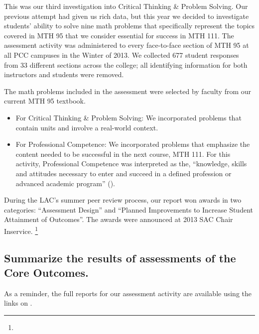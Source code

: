 \begin{description}
This was our third investigation into Critical Thinking \& Problem Solving.  Our previous attempt had given
us rich data, but this year we decided to investigate students' ability to solve
nine math problems that specifically represent the topics covered in MTH 95 that
we consider essential for success in MTH 111.  The assessment activity was
administered to every face-to-face section of MTH 95 at all PCC campuses in the
Winter of 2013.  We collected 677 student responses from 33 different sections
across the college; all identifying information for both instructors and
students were removed.

The math problems included in the assessment were selected by faculty from our
current MTH 95 textbook.
\begin{itemize}
\item For Critical Thinking \& Problem Solving: We incorporated problems that contain units and involve a
  real-world context.
\item For Professional Competence:  We incorporated problems that emphasize the content needed to be
  successful in the next course, MTH 111.  For this activity, Professional
  Competence was interpreted as the, ``knowledge, skills and attitudes necessary
  to enter and succeed in a defined profession or advanced academic program''
  (\cite{coreoutcomes}).
\end{itemize}
During the LAC's summer peer review process, our report won awards in two
categories: ``Assessment Design'' and ``Planned Improvements to Increase Student
Attainment of Outcomes''.  The awards were announced at 2013 SAC Chair
Inservice. \footnote{\awardsurl}
\end{description}

\subsection[Core outcome assessment results]{Summarize the results of assessments of the Core Outcomes.}
As a reminder, the full reports for our assessment activity are available using
the links on .


